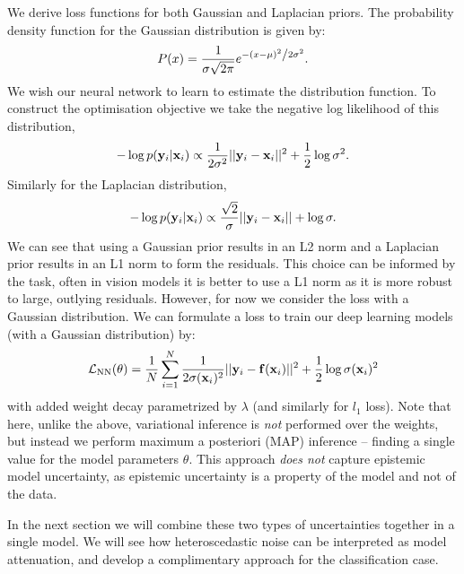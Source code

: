 We derive loss functions for both Gaussian and Laplacian priors.
The probability density function for the Gaussian distribution is given by:
\begin{equation}
P(x) = \frac{1}{{\sigma \sqrt {2\pi } }}e^{{{ - \left( {x - \mu } \right)^2 } \mathord{\left/ {\vphantom {{ - \left( {x - \mu } \right)^2 } {2\sigma ^2 }}} \right. \kern-\nulldelimiterspace} {2\sigma ^2 }}}.
\end{equation}
We wish our neural network to learn to estimate the distribution function. To construct the optimisation objective we take the negative log likelihood of this distribution,
\begin{equation}
-\log p(\mathbf{y}_i | \mathbf{x}_i) \propto \frac{1}{2\sigma^2}||\mathbf{y}_i - \mathbf{x}_i||^2 + \frac{1}{2} \log \sigma^2.
\end{equation}
Similarly for the Laplacian distribution,
\begin{equation}
-\log p(\mathbf{y}_i | \mathbf{x}_i) \propto \frac{\sqrt{2}}{\sigma}||\mathbf{y}_i - \mathbf{x}_i|| + \log \sigma.
\end{equation}
We can see that using a Gaussian prior results in an L2 norm and a Laplacian prior results in an L1 norm to form the residuals. This choice can be informed by the task, often in vision models it is better to use a L1 norm as it is more robust to large, outlying residuals.
However, for now we consider the loss with a Gaussian distribution. We can formulate a loss to train our deep learning models (with a Gaussian distribution) by:
\begin{equation}
\cL_\text{NN}(\theta) = \frac{1}{N} \sum_{i=1}^N \frac{1}{2\sigma(\x_i)^2} ||\y_i - \f(\x_i)||^2 + \frac{1}{2} \log \sigma(\x_i)^2 %
\end{equation}
with added weight decay parametrized by $\lambda$ (and similarly for $l_1$ loss).
Note that here, unlike the above, variational inference is \textit{not} performed over the weights, but instead we perform maximum a posteriori (MAP) inference -- finding a single value for the model parameters $\theta$. This approach \textit{does not} capture epistemic model uncertainty, as epistemic uncertainty is a property of the model and not of the data.

In the next section we will combine these two types of uncertainties together in a single model. We will see how heteroscedastic noise can be interpreted as model attenuation, and develop a complimentary approach for the classification case. %


